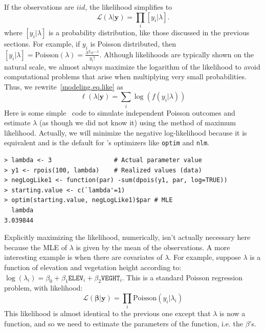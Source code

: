 If the observations are $iid$, the likelihood simplifies to
\begin{equation}
  \mathcal{L}(\lambda | \mathbf{y}) = \prod_i [y_i | \lambda].
  \label{modeling.eq.like}
\end{equation}
where $[y_i | \lambda]$ is a probability distribution, like those
discussed in the previous sections. For example, if $y_i$ is
Poisson distributed, then
$[y_i | \lambda] = \text{Poisson}(\lambda) = \frac{\lambda^{y_i}e^{-\lambda}}{y_i!}$.
Although likelihoods are typically shown on the natural scale, we
almost always maximize the logarithm of the likelihood to
avoid computational problems that arise when multiplying very small
probabilities. Thus, we rewrite~\ref{modeling.eq.like} as
\begin{equation}
  \ell(\lambda | \mathbf{y}) = \sum_i \log(f(y_i | \lambda))
  \label{modeling.eq.like2}
\end{equation}
Here is some simple \R~code to simulate independent Poisson outcomes
and estimate $\lambda$ (as though we did not know it) using the
method of maximum likelihood. Actually, we will minimize the negative
log-likelihood because it is equivalent and is the default for \R's
optimizers like \verb+optim+ and \verb+nlm+.
\begin{verbatim}
> lambda <- 3                 # Actual parameter value
> y1 <- rpois(100, lambda)    # Realized values (data)
> negLogLike1 <- function(par) -sum(dpois(y1, par, log=TRUE))
> starting.value <- c(`lambda'=1)
> optim(starting.value, negLogLike1)$par # MLE
  lambda
3.039844
\end{verbatim}
Explicitly maximizing the likelihood, numerically, isn't actually
necessary here because the MLE of
$\lambda$ is given by the  mean of the observations. A more interesting
example is when there are
covariates of $\lambda$. For example, suppose $\lambda$ is a function
of elevation and vegetation height according to: $\log(\lambda_i) =
\beta_0 + \beta_1\texttt{ELEV}_i + \beta_2\texttt{VEGHT}_i$. This is a
standard Poisson regression problem, with likelihood:
\begin{equation}
  \mathcal{L}(\bm{\beta} | \mathbf{y}) = \prod_i \text{Poisson}(y_i | \lambda_i)
  \label{modeling.eq.like3}
\end{equation}
This likelihood is almost identical to the previous one except
that $\lambda$ is now a function, and so we need to estimate the
parameters of the function, i.e. the $\beta$'s. %

